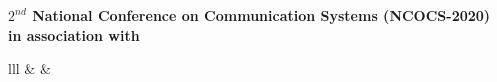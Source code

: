 \documentclass[12pt]{article}
\begin{document}
{		\vspace{-0.1cm}
		
		\begin{center}
			\textbf{\LARGE \color{red} $2^{nd}$ National Conference on Communication Systems (NCOCS-2020)}\\ 
			\vspace{0.25cm}
			{\large \textbf{in association with}}
		\end{center}
	
		\vspace{-0.8cm}
	
		\begin{table}[h!]
			\centering
			\large
			\begin{tabular}{lll}
				&  &                                                                                                                                                                                                                       \\
				\mult
\end{tabular}
\end{table}}
\end{document}
